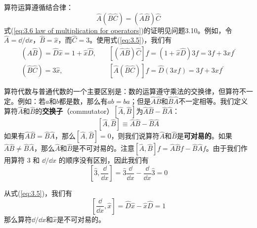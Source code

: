 	算符运算遵循结合律：
	\begin{equation}
		\hat{A}\left(\hat{B}\hat{C}\right) = \left(\hat{A}\hat{B}\right)\hat{C}
		\label{eq:3.6 law of multiplication for operators}
	\end{equation}
	式(\ref{eq:3.6 law of multiplication for operators})的证明见问题3.10。例如，令$\hat{A} = \dd /\dd x$，$\hat{B} = \hat{x}$，而$\hat{C} = 3$。使用式(\ref{eq:3.5})，我们有
	\begin{equation*}
		\begin{aligned}
			\left(\hat{A}\hat{B}\right) = \hat{D}\hat{x} = 1+ \hat{x}\hat{D}, \quad & \left[\left(\hat{A}\hat{B}\right)\hat{C}\right]f = \left(1+\hat{x}\hat{D}\right)3f = 3f+3xf^{\prime}\\
			\left(\hat{B}\hat{C}\right) = 3\hat{x},  \qquad \quad \qquad & \left[\hat{A}\left(\hat{B}\hat{C}\right)\right]f = \hat{D}\left(3xf\right) = 3f+3xf^{\prime}
		\end{aligned}
	\end{equation*}

	算符代数与普通代数的一个主要区别是：数的运算遵守乘法的交换律，但算符不一定。例如：若$a$和$b$都是数，那么有$ab=ba$；但是$\hat{A}\hat{B}$和$\hat{B}\hat{A}$不一定相等。我们定义算符$\hat{A}$和$\hat{B}$的\textbf{交换子}（commutator）$\left[\hat{A},\hat{B}\right]$为$\hat{A}\hat{B}-\hat{B}\hat{A}$：
	\begin{equation}
		\boxed{
			\left[\hat{A},\hat{B}\right] \equiv \hat{A}\hat{B} - \hat{B}\hat{A}
		}
		\label{eq:3.7 definition of commutator for two operators}
	\end{equation}
	如果有$\hat{A}\hat{B} = \hat{B}\hat{A}$，那么$\left[\hat{A},\hat{B}\right] = 0$，则我们说算符$\hat{A}$和$\hat{B}$是\textbf{可对易的}。如果$\hat{A}\hat{B} \neq \hat{B}\hat{A}$，那么$\hat{A}$和$\hat{B}$是不可对易的。注意$\left[\hat{A}, \hat{B}\right]f = \hat{A}\hat{B}f - \hat{B}\hat{A}f$。由于我们作用算符 3 和 $\dd /\dd x$ 的顺序没有区别，因此我们有
	\begin{equation*}
		\left[\hat{3},\frac{\dd }{\dd x}\right] = \hat{3}\frac{\dd }{\dd x} - \frac{\dd }{\dd x}\hat{3} = 0
	\end{equation*}

	从式(\ref{eq:3.5})，我们有
	\begin{equation}
		\left[\frac{\dd }{\dd x}, \hat{x}\right] = \hat{D}\hat{x}-\hat{x}\hat{D} = 1
		\label{eq:3.8}
	\end{equation}
	那么算符$\dd /\dd x$和$\hat{x}$是不可对易的。

